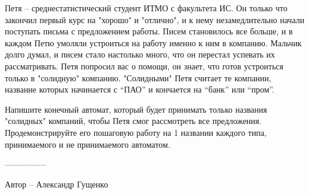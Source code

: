 \question
Петя -- среднестатистический студент ИТМО с факультета ИС. Он только что закончил первый курс на "хорошо" и "отлично", и к нему незамедлительно начали поступать письма с предложением работы. Писем становилось все больше, и в каждом Петю умоляли устроиться на работу именно к ним в компанию. Мальчик долго думал, и писем стало настолько много, что он перестал успевать их рассматривать. Петя попросил вас о помощи, он знает, что готов устроиться только в "солидную" компанию. "Солидными" Петя считает те компании, название которых начинается с “ПАО” и кончается на “банк” или “пром”. 

Напишите конечный автомат, который будет принимать только названия "солидных" компаний, чтобы Петя смог рассмотреть все предложения. Продемонстрируйте его пошаговую работу на 1 названии каждого типа, принимаемого и не принимаемого автоматом.

---------------

Автор -- Александр Гущенко
